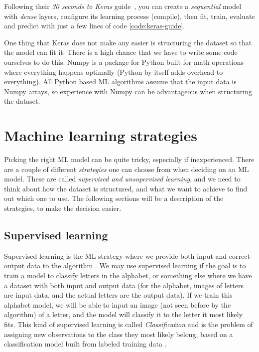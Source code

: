 Following their \textit{30 seconds to Keras} guide \cite{keras_docs}, you can create a \textit{sequential} model with \textit{dense}
layers, configure its learning process (compile), then fit, train, evaluate and predict with just a few lines of code \ref{code:keras-guide}.



One thing that Keras does not make any easier is structuring the dataset so that the model can fit it. There is a high chance that we have to write some 
code ourselves to do this. Numpy is a package for Python built for math operations where everything happens optimally (Python by itself adds overhead to everything). 
All Python based ML algorithms assume that the input data is Numpy arrays, so experience with Numpy can be advantageous when structuring the dataset.

\section{Machine learning strategies}
Picking the right ML model can be quite tricky, especially if inexperienced. There are a couple of different \textit{strategies} one can choose 
from when deciding on an ML model. These are called \textit{supervised and unsupervised learning}, and we need to think about how the dataset is structured, 
and what we want to achieve to find out which one to use. The following sections will be a description of the strategies, to make the decision easier.

\subsection{Supervised learning}
Supervised learning is the ML strategy where we provide both input and correct output data to the algorithm \cite{supervised_learning}. 
We may use supervised learning if the goal is to train a model to classify letters in the alphabet, or something else where we have a dataset with both input 
and output data (for the alphabet, images of letters are input data, and the actual letters are the output data). If we train this alphabet model, 
we will be able to input an image (not seen before by the algorithm) of a letter, and the model will classify it to the letter it most likely fits. 
This kind of supervised learning is called \textit{Classification} and is the problem of assigning new observations to the class they most likely belong, 
based on a classification model built from labeled training data \cite{supervised_learning}.

